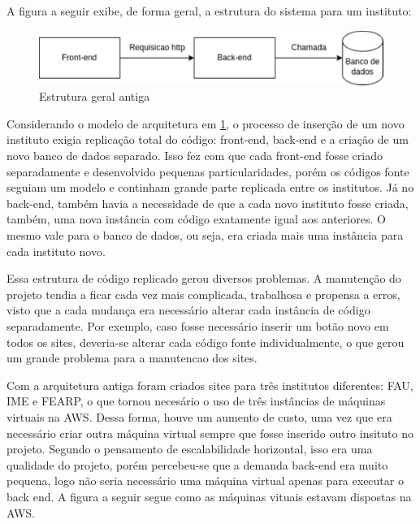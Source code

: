 \documentclass[12pt,twoside,english,brazilian]{article}
\begin{document}
A figura a seguir exibe, de forma geral, a estrutura do sistema para um instituto:

\begin{figure}[!htb]
\centering
\includegraphics[width=1\textwidth]{figuras/arquitetura_antiga.pdf}
\caption{Estrutura geral antiga}
\label{estrutura_antiga}
\end{figure}

Considerando o modelo de arquitetura em \ref{estrutura_antiga}, o processo de inserção de um novo instituto exigia replicação total do código: front-end, back-end e a criação de um novo banco de dados separado. Isso fez com que cada front-end fosse criado separadamente e desenvolvido pequenas particularidades, porém os códigos fonte seguiam um modelo e continham grande parte replicada entre os institutos. Já no back-end, também havia a necessidade de que a cada novo instituto fosse criada, também, uma nova instância com código exatamente igual aos anteriores. O mesmo vale para o banco de dados, ou seja, era criada mais uma instância para cada instituto novo.

Essa estrutura de código replicado gerou diversos problemas. A manutenção do projeto tendia a ficar cada vez mais complicada, trabalhosa e propensa a erros, visto que a cada mudança era necessário alterar cada instância de código separadamente. Por exemplo, caso fosse necessário inserir um botão novo em todos os sites, deveria-se alterar cada código fonte individualmente, o que gerou um grande problema para a manutencao dos sites. 

Com a arquitetura antiga foram criados sites para três institutos diferentes: FAU, IME e FEARP, o que tornou necesário o uso de três instâncias de máquinas virtuais na AWS. Dessa forma, houve um aumento de custo, uma vez que era necessário criar outra máquina virtual sempre que fosse inserido outro insituto no projeto. Segundo o pensamento de escalabilidade horizontal, isso era uma qualidade do projeto, porém percebeu-se que a demanda back-end era muito pequena, logo não seria necessário uma máquina virtual apenas para executar o back end.  
A figura a seguir segue como as máquinas vituais estavam dispostas na AWS.
\end{document}
